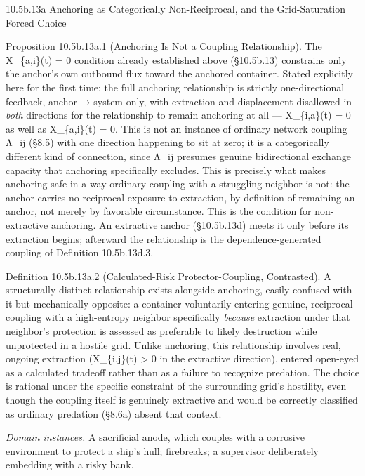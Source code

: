 \documentclass[
]{article}
\begin{document}
10.5b.13a Anchoring as Categorically Non-Reciprocal, and the
Grid-Saturation Forced Choice

Proposition 10.5b.13a.1 (Anchoring Is Not a Coupling Relationship). The
X\_\{a,i\}(t) = 0 condition already established above (§10.5b.13)
constrains only the anchor's own outbound flux toward the anchored
container. Stated explicitly here for the first time: the full anchoring
relationship is strictly one-directional feedback, anchor → system only,
with extraction and displacement disallowed in \emph{both} directions
for the relationship to remain anchoring at all --- X\_\{i,a\}(t) = 0 as
well as X\_\{a,i\}(t) = 0. This is not an instance of ordinary network
coupling Λ\_ij (§8.5) with one direction happening to sit at zero; it is
a categorically different kind of connection, since Λ\_ij presumes
genuine bidirectional exchange capacity that anchoring specifically
excludes. This is precisely what makes anchoring safe in a way ordinary
coupling with a struggling neighbor is not: the anchor carries no
reciprocal exposure to extraction, by definition of remaining an anchor,
not merely by favorable circumstance. This is the condition for
non-extractive anchoring. An extractive anchor (§10.5b.13d) meets it
only before its extraction begins; afterward the relationship is the
dependence-generated coupling of Definition 10.5b.13d.3.

Definition 10.5b.13a.2 (Calculated-Risk Protector-Coupling, Contrasted).
A structurally distinct relationship exists alongside anchoring, easily
confused with it but mechanically opposite: a container voluntarily
entering genuine, reciprocal coupling with a high-entropy neighbor
specifically \emph{because} extraction under that neighbor's protection
is assessed as preferable to likely destruction while unprotected in a
hostile grid. Unlike anchoring, this relationship involves real, ongoing
extraction (X\_\{i,j\}(t) \textgreater{} 0 in the extractive direction),
entered open-eyed as a calculated tradeoff rather than as a failure to
recognize predation. The choice is rational under the specific
constraint of the surrounding grid's hostility, even though the coupling
itself is genuinely extractive and would be correctly classified as
ordinary predation (§8.6a) absent that context.

\emph{Domain instances.} A sacrificial anode, which couples with a
corrosive environment to protect a ship's hull; firebreaks; a supervisor
deliberately embedding with a risky bank.
\end{document}
